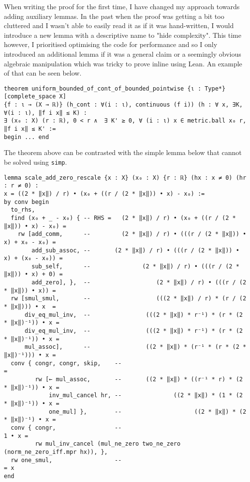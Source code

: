 \documentclass[11pt]{article}
\newenvironment{code}{\captionsetup{type=listing}}{}
\begin{document}
When writing the proof for the first time,
I have changed my approach towards adding auxiliary lemmas. In the past when the
proof was getting a bit too cluttered and I wasn't
able to easily read it as if it was hand-written, I would introduce a new lemma
with a descriptive name to "hide complexity". This time however, I prioritised
optimising the code for performance and so I only introduced an additional lemma
if it was a general claim or a seemingly obvious algebraic manipulation which
was tricky to prove inline using Lean. An example of that can be seen below.
\begin{code}
\begin{verbatim}
theorem uniform_bounded_of_cont_of_bounded_pointwise {ι : Type*} [complete_space X]
{f : ι → (X → ℝ)} (h_cont : ∀(i : ι), continuous (f i)) (h : ∀ x, ∃K, ∀(i : ι), ‖f i x‖ ≤ K) :
∃ (x₀ : X) (r : ℝ), 0 < r ∧  ∃ K' ≥ 0, ∀ (i : ι) x ∈ metric.ball x₀ r, ‖f i x‖ ≤ K' :=
begin ... end
\end{verbatim}
\end{code}

The theorem above can be contrasted with the simple lemma below
that cannot be solved using \texttt{simp}.
\begin{code}
\begin{verbatim}
lemma scale_add_zero_rescale {x : X} (x₀ : X) {r : ℝ} (hx : x ≠ 0) (hr : r ≠ 0) :
x = ((2 * ‖x‖) / r) • (x₀ + ((r / (2 * ‖x‖)) • x) - x₀) :=
by conv begin
  to_rhs,
  find (x₀ + _ - x₀) { -- RHS =   (2 * ‖x‖) / r) • (x₀ + ((r / (2 * ‖x‖)) • x) - x₀) =
    rw [add_comm,      --         (2 * ‖x‖) / r) • (((r / (2 * ‖x‖)) • x) + x₀ - x₀) =
        add_sub_assoc, --       (2 * ‖x‖) / r) • (((r / (2 * ‖x‖)) • x) + (x₀ - x₀)) =
        sub_self,      --               (2 * ‖x‖) / r) • (((r / (2 * ‖x‖)) • x) + 0) =
        add_zero], },  --                   (2 * ‖x‖) / r) • (((r / (2 * ‖x‖)) • x)) =
  rw [smul_smul,       --                   (((2 * ‖x‖) / r) * (r / (2 * ‖x‖))) • x  =
      div_eq_mul_inv,  --                (((2 * ‖x‖) * r⁻¹) * (r * (2 * ‖x‖)⁻¹)) • x =
      div_eq_mul_inv,  --                (((2 * ‖x‖) * r⁻¹) * (r * (2 * ‖x‖)⁻¹)) • x =
      mul_assoc],      --                ((2 * ‖x‖) * (r⁻¹ * (r * (2 * ‖x‖)⁻¹))) • x =
  conv { congr, congr, skip,    --                                                   =
         rw [← mul_assoc,       --       ((2 * ‖x‖) * ((r⁻¹ * r) * (2 * ‖x‖)⁻¹)) • x =
             inv_mul_cancel hr, --               ((2 * ‖x‖) * (1 * (2 * ‖x‖)⁻¹)) • x =
             one_mul] },        --                     ((2 * ‖x‖) * (2 * ‖x‖)⁻¹) • x =
  conv { congr,                 --                                             1 • x =
         rw mul_inv_cancel (mul_ne_zero two_ne_zero (norm_ne_zero_iff.mpr hx)), },
  rw one_smul,                  --                                                 = x
end
\end{verbatim}
\end{code}
\end{document}

